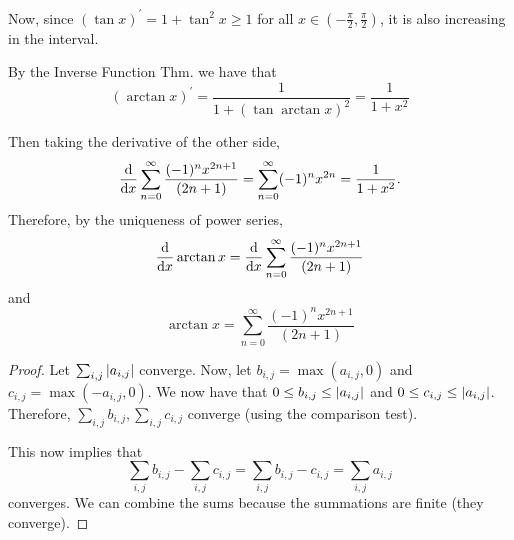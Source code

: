\documentclass[twoside]{article}
\begin{document}
    Now, since $(\tan x)^{\prime} = 1 + \tan^{2} x \geq 1$ for all $x \in (-\frac{\pi}{2}, \frac{\pi}{2})$,
    it is also increasing in the interval.

    By the Inverse Function Thm. we have that
    \begin{equation*}
        (\arctan x)^{\prime} = \frac{1}{1 + (\tan \arctan x)^{2}} = \frac{1}{1 + x^{2}}
    \end{equation*}

    Then taking the derivative of the other side,
    \begin{equation*}
        \dv{}{x} \sum_{n = 0}^{\infty} \frac{(-1)^{n}x^{2n + 1}}{(2n + 1)}
        = \sum_{n = 0}^{\infty} (-1)^{n} x^{2n} = \frac{1}{1 + x^{2}}.
    \end{equation*}
    Therefore, by the uniqueness of power series,
    \begin{equation*}
        \dv{}{x} \arctan x = \dv{}{x} \sum_{n = 0}^{\infty} \frac{(-1)^{n}x^{2n + 1}}{(2n + 1)}
    \end{equation*}
    and
    \begin{equation*}
         \arctan x = \sum_{n = 0}^{\infty} \frac{(-1)^{n}x^{2n + 1}}{(2n + 1)}
    \end{equation*}


    \begin{proof}
        Let $\sum_{i, j} \abs{a_{i,j}}$ converge. Now, let $b_{i,j} = \max(a_{i,j}, 0)$ and
        $c_{i,j} = \max(-a_{i,j}, 0)$. We now have that 
        $0 \leq b_{i,j} \leq \abs{a_{i,j}}$ and $0 \leq c_{i,j} \leq \abs{a_{i,j}}$.
        Therefore, $\sum_{i,j} b_{i,j}, \sum_{i,j} c_{i,j}$ converge (using the comparison test).

        This now implies that 
        \begin{equation*}
        \sum_{i,j} b_{i,j} - \sum_{i,j} c_{i,j} = \sum_{i,j} b_{i,j} - c_{i,j}
        = \sum_{i,j} a_{i,j}
        \end{equation*}
        converges. We can combine the sums because the summations are finite (they converge).
    \end{proof}

    
\end{document}
